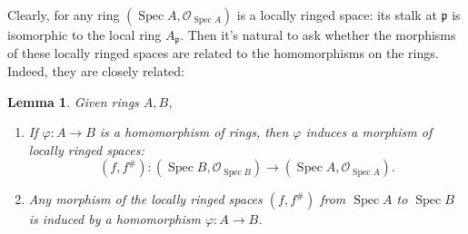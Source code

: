 \documentclass[12pt]{article}
\newtheorem{lemma}{Lemma}[subsection]
\theoremstyle{remark}
\newcommand{\Spec}[0]{\operatorname{Spec}}
\begin{document}
	Clearly, for any ring $(\Spec A, \mathscr O_{\Spec A})$ is a locally ringed space: its stalk at $\mathfrak p$ is isomorphic to the local ring $A_{\mathfrak p}$. Then it's natural to ask whether the morphisms of these locally ringed spaces are related to the homomorphisms on the rings. Indeed, they are closely related:
	\begin{lemma}\label{l221}
	Given rings $A, B$,
	\begin{enumerate}[\normalfont(a)]
		\item If $\varphi: A\to B$ is a homomorphism of rings, then $\varphi$ induces a morphism of locally ringed spaces:
		\[(f, f^\#):(\Spec B, \mathscr O_{\Spec B})\to (\Spec A, \mathscr O_{\Spec A}).\]
		\item Any morphism of the locally ringed spaces $(f, f^\#)$ from $\Spec A$ to $\Spec B$ is induced by a homomorphism $\varphi: A\to B$.
	\end{enumerate}
	\end{lemma}
\end{document}
